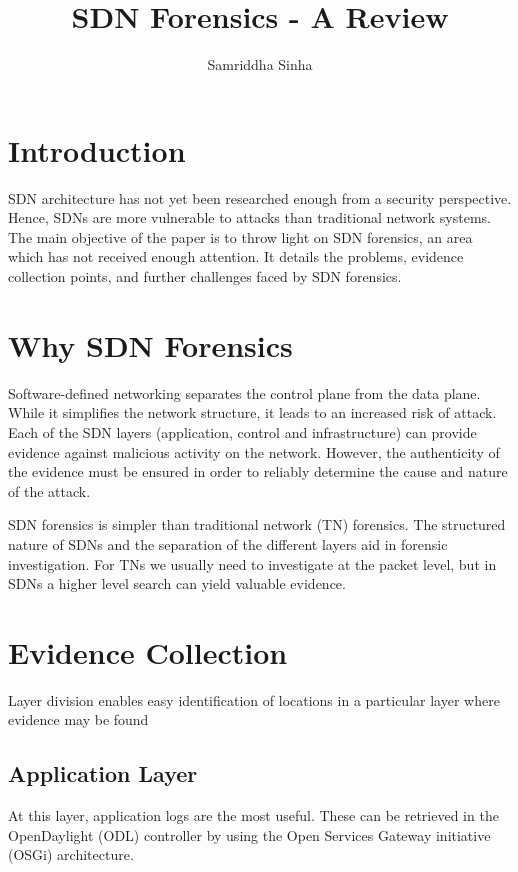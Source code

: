 \documentclass{article}
\title{SDN Forensics - A Review}
\author{Samriddha Sinha}
\affil{BE Undergraduate Student, CSIS department, Birla Institute of Technology and Science, Pilani, Rajasthan, India}
\begin{document}
\maketitle



\section{Introduction}

SDN architecture has not yet been researched enough from a security perspective. Hence, SDNs are more vulnerable to attacks than traditional network systems. The main objective of the paper is to throw light on SDN forensics, an area which has not received enough attention. It details the problems, evidence collection points, and further challenges faced by SDN forensics.

\section{Why SDN Forensics}

Software-defined networking separates the control plane from the data plane. While it simplifies the network structure, it leads to an increased risk of attack. Each of the SDN layers (application, control and infrastructure) can provide evidence against malicious activity on the network. However, the authenticity of the evidence must be ensured in order to reliably determine the cause and nature of the attack.

SDN forensics is simpler than traditional network (TN) forensics. The structured nature of SDNs and the separation of the different layers aid in forensic investigation. For TNs we usually need to investigate at the packet level, but in SDNs a higher level search can yield valuable evidence.

\section{Evidence Collection}

Layer division enables easy identification of locations in a particular layer where evidence may be found

\subsection{Application Layer}

At this layer, application logs are the most useful. These can be retrieved in the
OpenDaylight (ODL) controller by using the Open Services Gateway initiative (OSGi) architecture.
\end{document}
